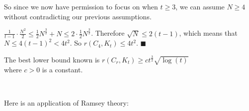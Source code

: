 \documentclass{book}
\newcommand{\hOne}{%
   \color{Black}%
   \fontsize{14}{16}\selectfont%
}
\newcommand{\teachComment}{
   \color{Orange}%
   \fontsize{12}{14}\selectfont%
}
\newenvironment{myIndent}{%
   \begin{adjustwidth}{2.5em}{0em}%
}{%
   \end{adjustwidth}%
}
\newenvironment{myTindent}{%
   \begin{adjustwidth}{7.5em}{0em}%
}{%
   \end{adjustwidth}%
}
\newcommand{\mySepTwo}[1][.]{%
   {\noindent\color{#1}{\rule{6.5in}{0.5mm}}}\\%
}
\newcommand{\retTwo}{\hfill\bigbreak}
\begin{document}
{\begin{myIndent}
   So since we now have permission to focus on when $t \geq 3$, we can assume $N \geq 4$\\ without contradicting our previous assumptions.\retTwo

   $\frac{1}{t-1}\cdot \frac{N^2}{2} \leq \frac{1}{2}N^\frac{3}{2} + N \leq 2\cdot\frac{1}{2}N^\frac{3}{2}$. Therefore $\sqrt{N} \leq 2(t-1)$, which means that $N \leq 4(t-1)^2 < 4t^2$. So $r(C_4, K_t) \leq 4t^2$. $\blacksquare$\retTwo
   
   {\begin{myTindent}\teachComment
      The best lower bound known is $r(C_r, K_t) \geq ct^\frac{3}{2}\sqrt{\log(t)}$\\ where $c>0$ is a constant.
   \end{myTindent}}

\end{myIndent}}

\mySepTwo

\hOne

Here is an application of Ramsey theory:
\end{document}
